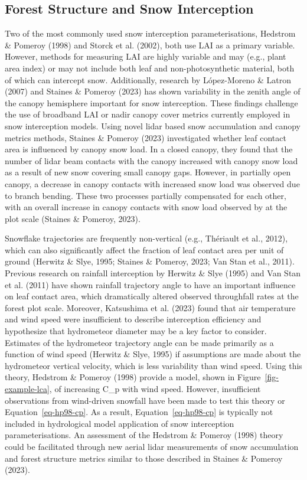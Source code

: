\documentclass[
  letterpaper,
]{tex/uofsthesis-cs}
\begin{document}
\subsection{Forest Structure and Snow
Interception}\label{forest-structure-and-snow-interception}

Two of the most commonly used snow interception parameterisations,
Hedstrom \& Pomeroy (1998) and Storck et al. (2002), both use LAI as a
primary variable. However, methods for measuring LAI are highly variable
and may (e.g., plant area index) or may not include both leaf and
non-photosynthetic material, both of which can intercept snow.
Additionally, research by López-Moreno \& Latron (2007) and Staines \&
Pomeroy (2023) has shown variability in the zenith angle of the canopy
hemisphere important for snow interception. These findings challenge the
use of broadband LAI or nadir canopy cover metrics currently employed in
snow interception models. Using novel lidar based snow accumulation and
canopy metrics methods, Staines \& Pomeroy (2023) investigated whether
leaf contact area is influenced by canopy snow load. In a closed canopy,
they found that the number of lidar beam contacts with the canopy
increased with canopy snow load as a result of new snow covering small
canopy gaps. However, in partially open canopy, a decrease in canopy
contacts with increased snow load was observed due to branch bending.
These two processes partially compensated for each other, with an
overall increase in canopy contacts with snow load observed by at the
plot scale (Staines \& Pomeroy, 2023).

Snowflake trajectories are frequently non-vertical (e.g., Thériault et
al., 2012), which can also significantly affect the fraction of leaf
contact area per unit of ground (Herwitz \& Slye, 1995; Staines \&
Pomeroy, 2023; Van Stan et al., 2011). Previous research on rainfall
interception by Herwitz \& Slye (1995) and Van Stan et al. (2011) have
shown rainfall trajectory angle to have an important influence on leaf
contact area, which dramatically altered observed throughfall rates at
the forest plot scale. Moreover, Katsushima et al. (2023) found that air
temperature and wind speed were insufficient to describe interception
efficiency and hypothesize that hydrometeor diameter may be a key factor
to consider. Estimates of the hydrometeor trajectory angle can be made
primarily as a function of wind speed (Herwitz \& Slye, 1995) if
assumptions are made about the hydrometeor vertical velocity, which is
less variability than wind speed. Using this theory, Hedstrom \& Pomeroy
(1998) provide a model, shown in Figure~\ref{fig-example-lca}, of
increasing C\_p with wind speed. However, insufficient observations from
wind-driven snowfall have been made to test this theory or
Equation~\ref{eq-hp98-cp}. As a result, Equation~\ref{eq-hp98-cp} is
typically not included in hydrological model application of snow
interception parameterisations. An assessment of the Hedstrom \& Pomeroy
(1998) theory could be facilitated through new aerial lidar measurements
of snow accumulation and forest structure metrics similar to those
described in Staines \& Pomeroy (2023).
\end{document}

